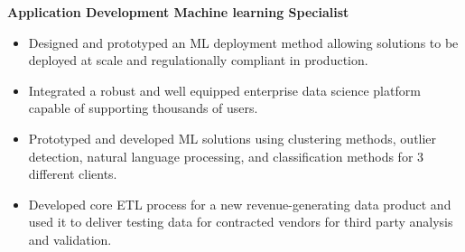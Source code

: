 \documentclass[10pt,a4paper,ragged2e]{altacv}
\begin{document}

\begin{fullwidth}
\makecvheader
\end{fullwidth}



\textbf{Application Development Machine learning Specialist}
\begin{itemize}
\item  Designed and prototyped an ML deployment method allowing solutions to be deployed at scale and regulationally compliant in production.
\item Integrated a robust and well equipped enterprise data science platform capable of supporting thousands of users. 
\item Prototyped and developed ML solutions using clustering methods,  outlier detection, natural language processing, and classification methods for 3 different clients. 
\item Developed core ETL process for a new revenue-generating data product and used it to deliver testing data for contracted vendors for third party analysis and validation.
\end{itemize}

\divider
\end{document}
